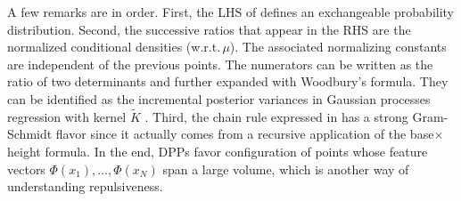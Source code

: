 \documentclass[twoside,11pt]{article}
\begin{document}

        A few remarks are in order.
        First, the LHS of  defines an exchangeable probability distribution.
        Second, the successive ratios that appear in the RHS are the normalized conditional densities (w.r.t.\,$\mu$).
        The associated normalizing constants are independent of the previous points.
        The numerators can be written as the ratio of two determinants and further expanded with Woodbury's formula.
        They can be identified as the incremental posterior variances in Gaussian processes regression with kernel $\tilde{K}$ \citep[Equation 2.26]{RaWi06}.
        Third, the chain rule expressed in  has a strong Gram-Schmidt flavor since it actually comes from a recursive application of the base$\times$height formula.
        In the end, DPPs favor configuration of points whose feature vectors $\Phi(x_1),\dots, \Phi(x_N)$ span a large volume, which is another way of understanding repulsiveness.
\end{document}
